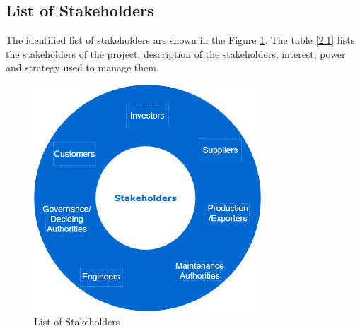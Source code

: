 \documentclass[a4paper]{article}
\begin{document}
\subsection{List of Stakeholders}
The identified list of stakeholders are shown in the Figure \ref{fig:2.1}. The table \ref{2.1} lists the stakeholders of the project, description of the stakeholders, interest, power and strategy used to manage them.\\
\begin{figure}[htbp]
    \centerline{\includegraphics[width=8.5cm]{Stakeholders.png}}
    \caption{List of Stakeholders}
    \label{fig:2.1}
\end{figure}
\end{document}
